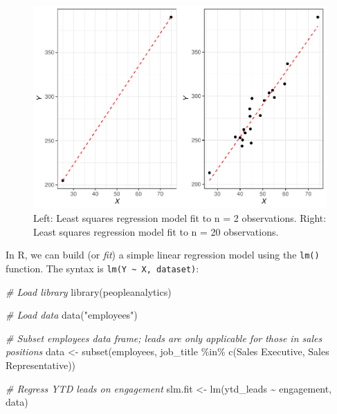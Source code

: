 \documentclass[
]{book}
\newenvironment{Shaded}{\begin{snugshade}}{\end{snugshade}}
\newcommand{\CommentTok}[1]{\textcolor[rgb]{0.56,0.35,0.01}{\textit{#1}}}
\newcommand{\FunctionTok}[1]{\textcolor[rgb]{0.00,0.00,0.00}{#1}}
\newcommand{\NormalTok}[1]{#1}
\newcommand{\OtherTok}[1]{\textcolor[rgb]{0.56,0.35,0.01}{#1}}
\newcommand{\SpecialCharTok}[1]{\textcolor[rgb]{0.00,0.00,0.00}{#1}}
\newcommand{\StringTok}[1]{\textcolor[rgb]{0.31,0.60,0.02}{#1}}
\begin{document}
\begin{figure}

{\centering \includegraphics[width=1\linewidth]{The_Fundamentals_of_People_Analytics_files/figure-latex/lm-fit-compare-1} 

}

\caption{Left: Least squares regression model fit to n = 2 observations. Right: Least squares regression model fit to n = 20 observations.}\label{fig:lm-fit-compare}
\end{figure}

In R, we can build (or \emph{fit}) a simple linear regression model using the \texttt{lm()} function. The syntax is \texttt{lm(Y\ \textasciitilde{}\ X,\ dataset)}:

\begin{Shaded}
\begin{Highlighting}[]
\CommentTok{\# Load library}
\FunctionTok{library}\NormalTok{(peopleanalytics)}

\CommentTok{\# Load data}
\FunctionTok{data}\NormalTok{(}\StringTok{"employees"}\NormalTok{)}

\CommentTok{\# Subset employees data frame; leads are only applicable for those in sales positions}
\NormalTok{data }\OtherTok{\textless{}{-}} \FunctionTok{subset}\NormalTok{(employees, job\_title }\SpecialCharTok{\%in\%} \FunctionTok{c}\NormalTok{(}\StringTok{\textquotesingle{}Sales Executive\textquotesingle{}}\NormalTok{, }\StringTok{\textquotesingle{}Sales Representative\textquotesingle{}}\NormalTok{))}

\CommentTok{\# Regress YTD leads on engagement}
\NormalTok{slm.fit }\OtherTok{\textless{}{-}} \FunctionTok{lm}\NormalTok{(ytd\_leads }\SpecialCharTok{\textasciitilde{}}\NormalTok{ engagement, data)}
\end{Highlighting}
\end{Shaded}
\end{document}
